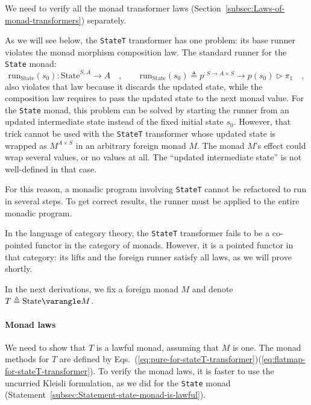 We need to verify all the monad transformer laws (Section~\ref{subsec:Laws-of-monad-transformers})
separately.

As we will see below, the \lstinline!StateT! transformer has one
problem: its base runner violates the monad morphism composition law.
The standard runner for the \lstinline!State! monad:
\[
\text{run}_{\text{State}}(s_{0}):\text{State}^{S,A}\rightarrow A\quad,\quad\quad\text{run}_{\text{State}}(s_{0})\triangleq p^{:S\rightarrow A\times S}\rightarrow p(s_{0})\triangleright\pi_{1}\quad,
\]
also violates that law because it discards the updated state, while
the composition law requires to pass the updated state to the next
monad value. For the \lstinline!State! monad, this problem can be
solved by starting the runner from an updated intermediate state instead
of the fixed initial state $s_{0}$. However, that trick cannot be
used with the \lstinline!StateT! transformer whose updated state
is wrapped as $M^{A\times S}$ in an arbitrary foreign monad $M$.
The monad $M$\textsf{'}s effect could wrap several values, or no values at
all. The \textsf{``}updated intermediate state\textsf{''} is not well-defined in that
case.

For this reason, a monadic program involving \lstinline!StateT! cannot
be refactored to run in several steps. To get correct results, the
runner must be applied to the entire monadic program.

In the language of category theory, the \lstinline!StateT! transformer
fails to be a co-pointed functor in the category of monads. However,
it is a pointed functor in that category: its lifts and the foreign
runner satisfy all laws, as we will prove shortly.

In the next derivations, we fix a foreign monad $M$ and denote $T\triangleq\text{State}\varangle M$.

\paragraph{Monad laws}

We need to show that $T$ is a lawful monad, assuming that $M$ is
one. The monad methods for $T$ are defined by Eqs.~(\ref{eq:pure-for-stateT-transformer})\textendash (\ref{eq:flatmap-for-stateT-transformer}).
To verify the monad laws, it is faster to use the uncurried Kleisli
formulation, as we did for the \lstinline!State! monad (Statement~\ref{subsec:Statement-state-monad-is-lawful}). 

